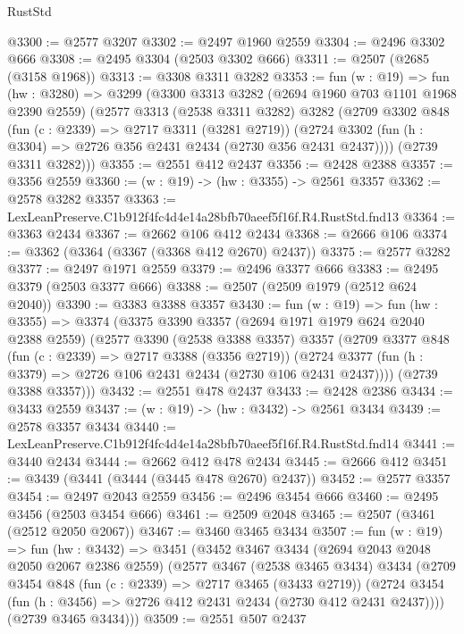 \begin{lexlean}{RustStd}
\begin{coremodule}
@3300 := @2577 @3207
@3302 := @2497 @1960 @2559
@3304 := @2496 @3302 @666
@3308 := @2495 @3304 (@2503 @3302 @666)
@3311 := @2507 (@2685 (@3158 @1968))
@3313 := @3308 @3311 @3282
@3353 := fun (w : @19) =>
  fun (hw : @3280) =>
  @3299
    (@3300
      @3313
      @3282
      (@2694 @1960 @703 @1101 @1968 @2390 @2559)
      (@2577
        @3313
        (@2538 @3311 @3282)
        @3282
        (@2709
          @3302
          @848
          (fun (c : @2339) => @2717 @3311 (@3281 @2719))
          (@2724 @3302 (fun (h : @3304) => @2726 @356 @2431 @2434 (@2730 @356 @2431 @2437))))
        (@2739 @3311 @3282)))
@3355 := @2551 @412 @2437
@3356 := @2428 @2388
@3357 := @3356 @2559
@3360 := (w : @19) -> (hw : @3355) -> @2561 @3357
@3362 := @2578 @3282 @3357
@3363 := LexLeanPreserve.C1b912f4fc4d4e14a28bfb70aeef5f16f.R4.RustStd.fnd13
@3364 := @3363 @2434
@3367 := @2662 @106 @412 @2434
@3368 := @2666 @106
@3374 := @3362 (@3364 (@3367 (@3368 @412 @2670) @2437))
@3375 := @2577 @3282
@3377 := @2497 @1971 @2559
@3379 := @2496 @3377 @666
@3383 := @2495 @3379 (@2503 @3377 @666)
@3388 := @2507 (@2509 @1979 (@2512 @624 @2040))
@3390 := @3383 @3388 @3357
@3430 := fun (w : @19) =>
  fun (hw : @3355) =>
  @3374
    (@3375
      @3390
      @3357
      (@2694 @1971 @1979 @624 @2040 @2388 @2559)
      (@2577
        @3390
        (@2538 @3388 @3357)
        @3357
        (@2709
          @3377
          @848
          (fun (c : @2339) => @2717 @3388 (@3356 @2719))
          (@2724 @3377 (fun (h : @3379) => @2726 @106 @2431 @2434 (@2730 @106 @2431 @2437))))
        (@2739 @3388 @3357)))
@3432 := @2551 @478 @2437
@3433 := @2428 @2386
@3434 := @3433 @2559
@3437 := (w : @19) -> (hw : @3432) -> @2561 @3434
@3439 := @2578 @3357 @3434
@3440 := LexLeanPreserve.C1b912f4fc4d4e14a28bfb70aeef5f16f.R4.RustStd.fnd14
@3441 := @3440 @2434
@3444 := @2662 @412 @478 @2434
@3445 := @2666 @412
@3451 := @3439 (@3441 (@3444 (@3445 @478 @2670) @2437))
@3452 := @2577 @3357
@3454 := @2497 @2043 @2559
@3456 := @2496 @3454 @666
@3460 := @2495 @3456 (@2503 @3454 @666)
@3461 := @2509 @2048
@3465 := @2507 (@3461 (@2512 @2050 @2067))
@3467 := @3460 @3465 @3434
@3507 := fun (w : @19) =>
  fun (hw : @3432) =>
  @3451
    (@3452
      @3467
      @3434
      (@2694 @2043 @2048 @2050 @2067 @2386 @2559)
      (@2577
        @3467
        (@2538 @3465 @3434)
        @3434
        (@2709
          @3454
          @848
          (fun (c : @2339) => @2717 @3465 (@3433 @2719))
          (@2724 @3454 (fun (h : @3456) => @2726 @412 @2431 @2434 (@2730 @412 @2431 @2437))))
        (@2739 @3465 @3434)))
@3509 := @2551 @507 @2437

\end{coremodule}
\end{lexlean}
